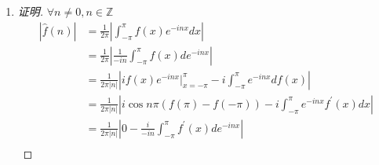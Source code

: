 \documentclass{article}
\begin{document}
\begin{enumerate}
\begin{enumerate}
\begin{proof}[证明]
\begin{equation}
\begin{aligned}
                    f(x)
                    &\sim\hat{f}(0)+\sum_{n\geq1}(\hat{f}(n)+\hat{f}(-n))\cos nx+\sum_{n\geq1}i(\hat{f}(n)-\hat{f}(-n))\sin nx \\
                    &=Re(\hat{f}(0))+Im(\hat{f}(0)) \\
                    & \ \ \ \ +\sum_{n\geq1}(Re(\hat{f}(n))+Im(\hat{f}(n))+Re(\hat{f}(-n))+Im(\hat{f}(-n)))\cos nx \\
                    &\ \ \ \ +\sum_{n\geq1}i(Re(\hat{f}(n))+Im(\hat{f}(n))-Re(\hat{f}(-n))-Im(\hat{f}(-n)))\sin nx \\
                \end{aligned}
            \end{equation}
            由 $f$ 是实值函数得\begin{equation}
                \begin{aligned}
                    Im(\hat{f}(0))&=0 \\
                    Im(\hat{f}(n))&=-Im(\hat{f}(-n)) \\
                    Re(\hat{f}(n))&=Re(\hat{f}(-n))
                \end{aligned}
            \end{equation}
            进而得\begin{equation}
                \overline{\hat{f}(n)}=\hat{f}(-n)
            \end{equation}
            综上, 得证.
        \end{proof}
    \end{enumerate}
    \item \begin{proof}[证明]
    $\forall n\neq0, n\in\mathbb{Z}$
        \begin{equation}
            \begin{aligned}
                |\hat{f}(n)|
                &=\frac{1}{2\pi}\left|\int_{-\pi}^{\pi}f(x)e^{-inx}dx\right| \\
                &=\frac{1}{2\pi}\left|\frac{1}{-in}\int_{-\pi}^{\pi}f(x)de^{-inx}\right| \\
                &=\frac{1}{2\pi|n|}\left|i f(x)e^{-inx}|_{x=-\pi}^{\pi}-i\int_{-\pi}^{\pi}e^{-inx}df(x)\right| \\
                &=\frac{1}{2\pi|n|}\left|i\cos n\pi(f(\pi)-f(-\pi))-i\int_{-\pi}^{\pi}e^{-inx}f^{'}(x)dx\right| \\
                &=\frac{1}{2\pi|n|}\left|0-\frac{i}{-in}\int_{-\pi}^{\pi}f^{'}(x)de^{-inx}\right| \\

\end{aligned}
\end{equation}
\end{proof}
\end{enumerate}
\end{document}
